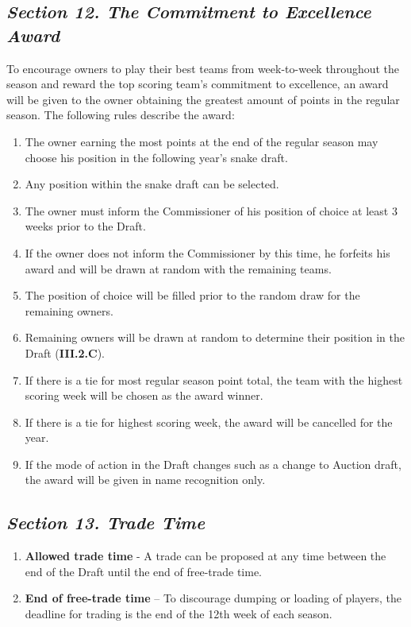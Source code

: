 \documentclass{article}
\begin{document}
    \subsection{\textit{Section 12. The Commitment to Excellence Award}}
    To encourage owners to play their best teams from week-to-week throughout the season and reward the top scoring team’s commitment to excellence, an award will be given to the owner obtaining the greatest amount of points in the regular season. The following rules describe the award:
    \begin{enumerate}[label=\Alph*)]
        \item The owner earning the most points at the end of the regular season may choose his position in the following year’s snake draft.
        \item Any position within the snake draft can be selected.
        \item The owner must inform the Commissioner of his position of choice at least 3 weeks prior to the Draft.
        \item If the owner does not inform the Commissioner by this time, he forfeits his award and will be drawn at random with the remaining teams.
        \item The position of choice will be filled prior to the random draw for the remaining owners.
        \item Remaining owners will be drawn at random to determine their position in the Draft (\textbf{III.2.C}).
        \item If there is a tie for most regular season point total, the team with the highest scoring week will be chosen as the award winner.
        \item If there is a tie for highest scoring week, the award will be cancelled for the year.
        \item If the mode of action in the Draft changes such as a change to Auction draft, the award will be given in name recognition only.
    \end{enumerate}
    \subsection{\textit{Section 13. Trade Time}}
    \begin{enumerate}[label=\Alph*)]
        \item\textbf{Allowed trade time} - A trade can be proposed at any time between the end of the Draft until the end of free-trade time.
        \item\textbf{End of free-trade time} – To discourage dumping or loading of players, the deadline for trading is the end of the 12th week of each season.
    \end{enumerate}
\end{document}
